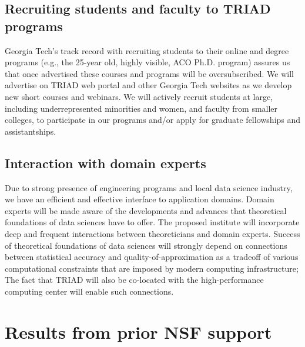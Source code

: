 \documentclass[12pt]{article}
\begin{document}
\vspace*{-1em}

\subsection{Recruiting students and faculty to TRIAD programs}
\label{sec:recruit}

Georgia Tech's track record with recruiting students to their online and degree programs (e.g., the 25-year old, highly visible, ACO Ph.D. program) assures us that once advertised these courses and programs will be oversubscribed.
We will advertise on TRIAD web portal and other Georgia Tech websites as we develop new short courses and webinars.
We will  actively recruit students at large, including underrepresented minorities and women, and faculty from smaller colleges, to participate in our programs and/or apply for graduate fellowships and assistantships.

\vspace*{-1em}
\subsection{Interaction with domain experts}

Due to strong presence of engineering programs and local data science industry, we have an efficient and effective interface to application domains.
Domain experts will be made aware of the developments and advances that theoretical foundations of data sciences have to offer.
The proposed institute will incorporate deep and frequent interactions between
theoreticians and domain experts.
Success of theoretical foundations of data sciences will strongly depend on connections between statistical accuracy and quality-of-approximation as a tradeoff of various computational constraints that are imposed by
modern computing infrastructure; The fact that TRIAD will also be co-located with the high-performance computing center will enable such connections.


\vspace*{1em}
\section{Results from prior NSF support}%
\vspace*{-0.5em}
\end{document}
